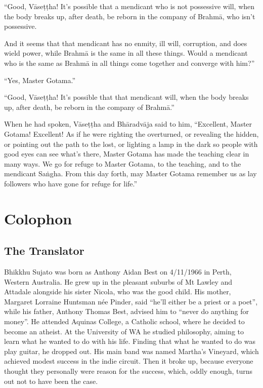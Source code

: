 \documentclass[12pt,openany]{book}%
\let\oldbackmatter\backmatter
\renewcommand{\backmatter}{%
\chapterfont{\setstretch{.85}\normalfont\centering}%
\sectionfont{\setstretch{.85}\Semiboldsubheadfont}%
\oldbackmatter}
\begin{document}
“Good, \textsanskrit{Vāseṭṭha}! It’s possible that a mendicant who is not possessive will, when the body breaks up, after death, be reborn in the company of \textsanskrit{Brahmā}, who isn’t possessive. 

And it seems that that mendicant has no enmity, ill will, corruption, and does wield power, while \textsanskrit{Brahmā} is the same in all these things. Would a mendicant who is the same as \textsanskrit{Brahmā} in all things come together and converge with him?” 

“Yes, Master Gotama.” 

“Good, \textsanskrit{Vāseṭṭha}! It’s possible that that mendicant will, when the body breaks up, after death, be reborn in the company of \textsanskrit{Brahmā}.” 

When he had spoken, \textsanskrit{Vāseṭṭha} and \textsanskrit{Bhāradvāja} said to him, “Excellent, Master Gotama! Excellent! As if he were righting the overturned, or revealing the hidden, or pointing out the path to the lost, or lighting a lamp in the dark so people with good eyes can see what’s there, Master Gotama has made the teaching clear in many ways. We go for refuge to Master Gotama, to the teaching, and to the mendicant \textsanskrit{Saṅgha}. From this day forth, may Master Gotama remember us as lay followers who have gone for refuge for life.” 

%
\backmatter%
\chapter*{Colophon}

\section*{The Translator}

Bhikkhu Sujato was born as Anthony Aidan Best on 4/11/1966 in Perth, Western Australia. He grew up in the pleasant suburbs of Mt Lawley and Attadale alongside his sister Nicola, who was the good child. His mother, Margaret Lorraine Huntsman née Pinder, said “he’ll either be a priest or a poet”, while his father, Anthony Thomas Best, advised him to “never do anything for money”. He attended Aquinas College, a Catholic school, where he decided to become an atheist. At the University of WA he studied philosophy, aiming to learn what he wanted to do with his life. Finding that what he wanted to do was play guitar, he dropped out. His main band was named Martha’s Vineyard, which achieved modest success in the indie circuit. Then it broke up, because everyone thought they personally were reason for the success, which, oddly enough, turns out not to have been the case. 
\end{document}
